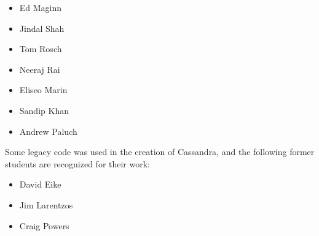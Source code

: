 \begin{itemize}

\item Ed Maginn
\item Jindal Shah
\item Tom Rosch
\item Neeraj Rai
\item Eliseo Marin
\item Sandip Khan
\item Andrew Paluch
\end{itemize}


Some legacy code was used in the creation of Cassandra, and the following former students are recognized for their work:

\begin{itemize}
\item David Eike
\item Jim Larentzos
\item Craig Powers
\end{itemize}
